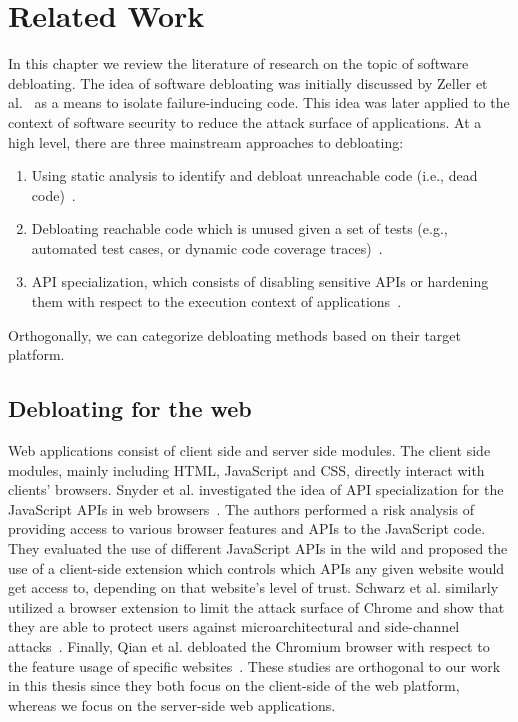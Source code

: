 \chapter{Related Work}
\label{chap:relatedwork}

In this chapter we review the literature of research on the topic of software debloating. 
The idea of software debloating was initially discussed by Zeller et al.~\cite{zeller2002simplifying} as a means to isolate failure-inducing code. 
This idea was later applied to the context of software security to reduce the attack surface of applications. 
At a high level, there are three mainstream approaches to debloating: 

\begin{enumerate}
    \item Using static analysis to identify and debloat unreachable code (i.e., dead code)~\cite{redini2019b, snyder2017most, quach2018debloating, mininode, 255308}.
    \item Debloating reachable code which is unused given a set of tests (e.g., automated test cases, or dynamic code coverage traces)~\cite{lessismore, heo2018effective,qian2020slimium, koo2019configuration}.
    \item API specialization, which consists of disabling sensitive APIs or hardening them with respect to the execution context of applications~\cite{mishra2020saffire, saphire, jahanshahi2020you, mishra2021sgxpecial}. 
\end{enumerate}

Orthogonally, we can categorize debloating methods based on their target platform. 

\section{Debloating for the web}

Web applications consist of client side and server side modules. 
The client side modules, mainly including HTML, JavaScript and CSS, directly interact with clients' browsers. 
Snyder et al. investigated the idea of API specialization for the JavaScript APIs in web browsers~\cite{snyder2017vibrate}. 
The authors performed a risk analysis of providing access to various browser features and APIs to the JavaScript code.
They evaluated the use of different
JavaScript APIs in the wild and proposed the use of a client-side extension
which controls which APIs any given website would get access to, depending
on that website's level of trust. 
Schwarz et al. similarly utilized a browser
extension to limit the attack surface of Chrome and show that they are able
to protect users against microarchitectural and side-channel
attacks~\cite{Schwarz2018}. 
Finally, Qian et al. debloated the Chromium browser with respect to the feature usage of specific websites~\cite{qian2020slimium}. 
These studies are orthogonal to our work in this thesis since
they both focus on the client-side of the web platform, whereas we focus on
the server-side web applications.

